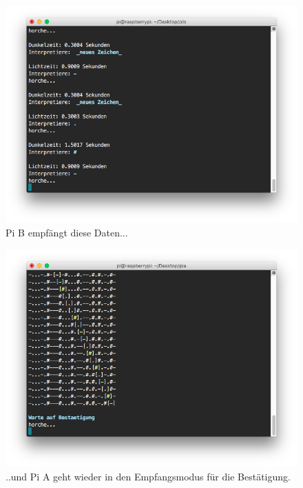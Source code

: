 \documentclass[12pt, a4paper]{article}
\begin{document}
\newpage
\begin{figure}[H]
	\centering
	\includegraphics[width=1.0\textwidth]{sshot_26.png}
	\caption{Pi B empfängt diese Daten...}
\end{figure}

\newpage
\begin{figure}[H]
	\centering
	\includegraphics[width=1.0\textwidth]{sshot_31.png}
	\caption{..und Pi A geht wieder in den Empfangsmodus für die Bestätigung.}
\end{figure}
\end{document}
